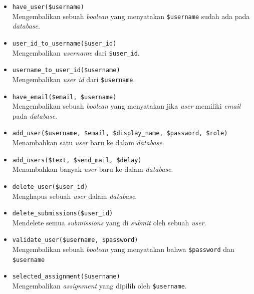 \documentclass[a4paper,twoside]{article}
\begin{document}
\begin{enumerate}
\begin{itemize}
\begin{itemize}
			                  \begin{itemize}
				                  \item \verb|have_user($username)| \\
				                        Mengembalikan sebuah \textit{boolean} yang menyatakan \verb|$username| sudah ada pada \textit{database}.
				                  \item \verb|user_id_to_username($user_id)| \\
				                        Mengembalikan \textit{username} dari \verb|$user_id|.
				                  \item \verb|username_to_user_id($username)| \\
				                        Mengembalikan \textit{user id} dari \verb|$username|.
				                  \item \verb|have_email($email, $username)| \\
				                        Mengembalikan sebuah \textit{boolean} yang menyatakan jika \textit{user} memiliki \textit{email} pada \textit{database}.
				                  \item \verb|add_user($username, $email, $display_name, $password, $role)| \\
				                        Menambahkan satu \textit{user} baru ke dalam \textit{database}.
				                  \item \verb|add_users($text, $send_mail, $delay)| \\
				                        Menambahkan banyak \textit{user} baru ke dalam \textit{database}.
				                  \item \verb|delete_user($user_id)| \\
				                        Menghapus sebuah \textit{user} dalam \textit{database}.
				                  \item \verb|delete_submissions($user_id)| \\
				                        Mendelete semua \textit{submissions} yang di \textit{submit} oleh sebuah \textit{user}.
				                  \item \verb|validate_user($username, $password)| \\
				                        Mengembalikan sebuah \textit{boolean} yang menyatakan bahwa \verb|$password| dan \verb|$username|
				                  \item \verb|selected_assignment($username)| \\
				                        Mengembalikan \textit{assignment} yang dipilih oleh \verb|$username|.

\end{itemize}
\end{itemize}
\end{itemize}
\end{enumerate}
\end{document}
